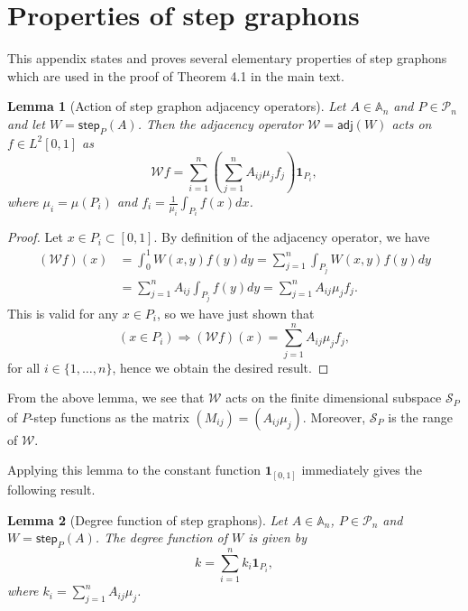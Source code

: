 \documentclass[11pt]{article}
\def\AA{\mathbb{A}}
\def\II{\bm{1}}
\def\calP{\mathcal{P}}
\def\calW{\mathcal{W}}
\newcommand{\sans}[1]{\mathsf{#1}}
\def\adj{\sans{adj}}
\def\step{\sans{step}}
\newtheorem{lemma}{Lemma}[section]
\theoremstyle{definition}
\begin{document}
\section{Properties of step graphons} \label{sec:step-graphons}

This appendix states and proves several elementary properties of step graphons which are used in the proof of Theorem 4.1 in the main text.

\begin{lemma}[Action of step graphon adjacency operators] \label{lemma:step-graphon-adjacency-app}
    Let $A\in \AA_n$ and $P \in \calP_n$ and let $W = \step_P (A)$. Then the adjacency operator $\calW = \adj (W)$ acts on $f \in L^2 [0,1]$ as
    $$ \calW f = \sum_{i=1}^n \left( \sum_{j=1}^n A_{ij} \mu_j f_j \right) \II_{P_i}, $$
    where $\mu_i = \mu(P_i)$ and $f_i = \frac{1}{\mu_i} \int_{P_i} f(x) dx$.
\end{lemma}
\begin{proof}
    Let $x \in P_i \subset [0,1]$. By definition of the adjacency operator, we have
    \begin{align*}
        (\calW f)(x) &= \int_0^1 W(x,y) f(y) dy = \sum_{j=1}^n \int_{P_j} W(x,y) f(y) dy\\
        & = \sum_{j=1}^n A_{ij} \int_{P_j} f(y) dy = \sum_{j=1}^n A_{ij} \mu_j f_j.
    \end{align*}
    This is valid for any $x \in P_i$, so we have just shown that 
    $$ (x \in P_i) \Rightarrow (\calW f)(x) = \sum_{j=1}^n A_{ij} \mu_j f_j, $$
    for all $i \in \{1,\dots,n\}$, hence we obtain the desired result.
\end{proof}

From the above lemma, we see that $\calW$ acts on the finite dimensional subspace $\mathcal{S}_P$ of $P$-step functions as the matrix $(M_{ij}) = (A_{ij} \mu_j)$. Moreover, $\mathcal{S}_P$ is the range of $\calW$.

Applying this lemma to the constant function $\II_{[0,1]}$ immediately gives the following result.
\begin{lemma}[Degree function of step graphons]
    Let $A\in \AA_n$, $P \in \calP_n$ and $W = \step_P (A)$. The degree function of $W$ is given by
    $$ k = \sum_{i=1}^n k_i \II_{P_i}, $$
    where $k_i = \sum_{j=1}^n A_{ij} \mu_j$.
\end{lemma}
\end{document}
